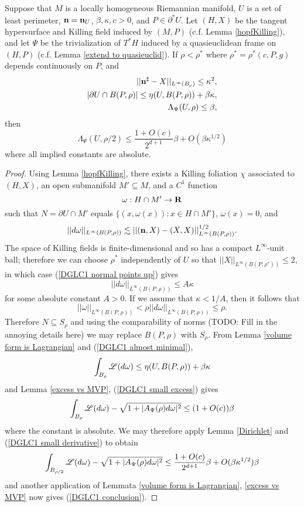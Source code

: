 \begin{lemma}\label{DGLC1}
Suppose that $M$ is a locally homogeneous Riemannian manifold, $U$ is a set of least perimeter, $\mathbf n = \mathbf n_U$, $\beta, \kappa, c > 0$, and $P \in \partial^* U$.
Let $(H, X)$ be the tangent hypersurface and Killing field induced by $(M, P)$ (c.f. Lemma \ref{hopfKilling}), and let $\Psi$ be the trivialization of $T^* H$ induced by a quasieuclidean frame on $(H, P)$ (c.f. Lemma \ref{extend to quasieuclid}).
If $\rho < \rho^*$ where $\rho^* = \rho^*(c, P, g)$ depends continuously on $P$, and
\begin{align}
||\mathbf n^\sharp - X||_{L^\infty(B_\rho)} \leq \kappa^2, \label{DGLC1 normal points up} \\
|\partial U \cap B(P, \rho)| \leq \eta(U, B(P, \rho)) + \beta \kappa, \label{DGLC1 almost minimal} \\
\Lambda_\Psi(U, \rho) \leq \beta, \label{DGLC1 small excess}
\end{align}
then 
\begin{equation}
\Lambda_\Psi(U, \rho/2) \leq \frac{1 + O(c)}{2^{d + 1}} \beta + O(\beta \kappa^{1/2}) \label{DGLC1 conclusion}
\end{equation}
where all implied constants are absolute.
\end{lemma}
\begin{proof}
Using Lemma \ref{hopfKilling}, there exists a Killing foliation $\chi$ associated to $(H, X)$, an open submanifold $M' \subseteq M$, and a $C^1$ function
$$\omega: H \cap M' \to \mathbf{R}$$
such that $N = \partial U \cap M'$ equals $\{(x, \omega(x)): x \in H \cap M'\}$, $\omega(x) = 0$, and 
$$||d\omega||_{L^\infty(B(P, \rho))} \lesssim ||(\mathbf n, X) - (X, X)||_{L^\infty(B(P, \rho))}^{1/2}.$$
The space of Killing fields is finite-dimensional and so has a compact $L^\infty$-unit ball; therefore we can choose $\rho^*$ independently of $U$ so that $||X||_{L^\infty(B(P, \rho^*))} \leq 2$, in which case (\ref{DGLC1 normal points up}) gives
\begin{equation}\label{DGLC1 small derivative}
||d\omega||_{L^\infty(B(P, \rho))} \leq A\kappa
\end{equation}
for some absolute constant $A > 0$. If we assume that $\kappa < 1/A$, then it follows that 
$$||\omega||_{L^\infty(B(P, \rho))} < \rho ||d\omega||_{L^\infty(B(P, \rho))} \leq \rho.$$
Therefore $N \subseteq S_\rho$ and using the comparability of norms (TODO: Fill in the annoying details here) we may replace $B(P, \rho)$ with $S_\rho$.
From Lemma \ref{volume form is Lagrangian} and (\ref{DGLC1 almost minimal}),
$$\int_{B_\rho} \mathscr L(d\omega) \leq \eta(U, B(P, \rho)) + \beta \kappa$$
and Lemma \ref{excess vs MVP}, (\ref{DGLC1 small excess}) gives 
$$\int_{B_\rho} \mathscr L(d\omega) - \sqrt{1 + |A_\Psi(\rho)d\omega|^2} \leq (1 + O(c)) \beta$$
where the constant is absolute.
We may therefore apply Lemma \ref{Dirichlet} and (\ref{DGLC1 small derivative}) to obtain
$$\int_{B_{\rho/2}} \mathscr L(d\omega) - \sqrt{1 + |A_\Psi(\rho)d\omega|^2} \leq \frac{1 + O(c)}{2^{d + 1}} \beta + O(\beta \kappa^{1/2}) \beta$$
and another application of Lemmata \ref{volume form is Lagrangian}, \ref{excess vs MVP} now gives (\ref{DGLC1 conclusion}).
\end{proof}
